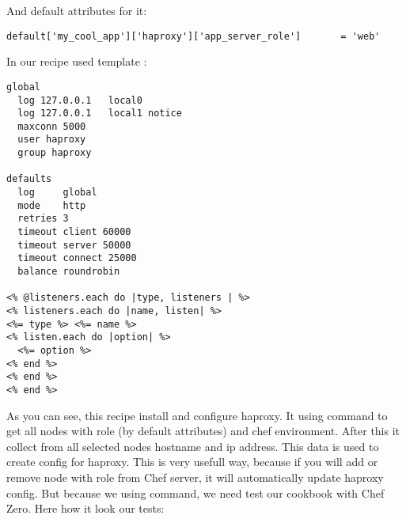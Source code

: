 And default attributes for it:

\begin{lstlisting}[label=lst:testing-chef-zero13]
default['my_cool_app']['haproxy']['app_server_role']       = 'web'
\end{lstlisting}

In our recipe used template :

\begin{lstlisting}[label=lst:testing-chef-zero14]
global
  log 127.0.0.1   local0
  log 127.0.0.1   local1 notice
  maxconn 5000
  user haproxy
  group haproxy

defaults
  log     global
  mode    http
  retries 3
  timeout client 60000
  timeout server 50000
  timeout connect 25000
  balance roundrobin

<% @listeners.each do |type, listeners | %>
<% listeners.each do |name, listen| %>
<%= type %> <%= name %>
<% listen.each do |option| %>
  <%= option %>
<% end %>
<% end %>
<% end %>
\end{lstlisting}

As you can see, this recipe install and configure haproxy. It using  command to get all nodes with role  (by default attributes) and chef environment. After this it collect from all selected nodes hostname and ip address. This data is used to create config for haproxy. This is very usefull way, because if you will add or remove node with role  from Chef server, it will automatically update haproxy config. But because we using  command, we need test our cookbook with Chef Zero. Here how it look our tests:

